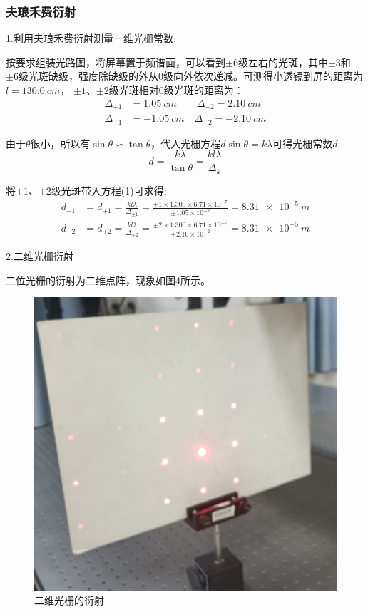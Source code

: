 \documentclass{ctexart}
\begin{document}
\subsubsection*{夫琅禾费衍射}
1.利用夫琅禾费衍射测量一维光栅常数:

按要求组装光路图，将屏幕置于频谱面，可以看到$\pm6$级左右的光斑，其中$\pm3$和
$\pm6$级光斑缺级，强度除缺级的外从0级向外依次递减。可测得小透镜到屏的距离为$l = \qty{130.0}{cm}$，
$\pm1$、$\pm2$级光斑相对0级光斑的距离为：
$$
\begin{aligned}
\Delta_{+1} &= \qty{1.05}{cm} \qquad \Delta_{+2} = \qty{2.10}{cm} \\
\Delta_{-1} &= \qty{-1.05}{cm} \quad \Delta_{-2} = \qty{-2.10}{cm}
\end{aligned}
$$

由于$\theta$很小，所以有$\sin{\theta}\backsim \tan{\theta}$，代入光栅方程$d\sin{\theta} = k\lambda$可得光栅常数$d$:
\begin{equation}
	d = \frac{k\lambda}{\tan{\theta}} = \frac{kl\lambda}{\Delta_k}
\end{equation}

将$\pm1$、$\pm2$级光斑带入方程(1)可求得:
\begin{equation}
	\begin{aligned}
		d_{-1} &= d_{+1} = \frac{kl\lambda}{\Delta_{\pm1}} = \frac{\pm1\times1.300\times6.71\times10^{-7}}{\pm1.05\times10^{-2}} = \qty{8.31e-5}{m} \\
		d_{-2} &= d_{+2} = \frac{kl\lambda}{\Delta_{\pm2}} = \frac{\pm2\times1.300\times6.71\times10^{-7}}{\pm2.10\times10^{-2}} = \qty{8.31e-5}{m}
	\end{aligned}
\end{equation}

2.二维光栅衍射

二位光栅的衍射为二维点阵，现象如图4所示。

\begin{figure}
	\centering
	\includegraphics[scale=0.06]{4.jpg}
	\caption{二维光栅的衍射}
\end{figure}
\end{document}
